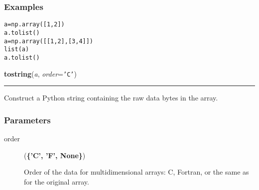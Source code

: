 \begin{boxedminipage}{\textwidth}

\hypertarget{examples}{}
\subsubsection*{Examples}
\begin{alltt}
\pysrcprompt{{\textgreater}{\textgreater}{\textgreater} }a = np.array([1, 2])
\pysrcprompt{{\textgreater}{\textgreater}{\textgreater} }a.tolist()
\pysrcoutput{[1, 2]}
\pysrcoutput{}\pysrcprompt{{\textgreater}{\textgreater}{\textgreater} }a = np.array([[1, 2], [3, 4]])
\pysrcprompt{{\textgreater}{\textgreater}{\textgreater} }list(a)
\pysrcoutput{}\pysrcprompt{{\textgreater}{\textgreater}{\textgreater} }a.tolist()
\pysrcoutput{[[1, 2], [3, 4]]}\end{alltt}
    \vspace{1ex}

    \end{boxedminipage}

    \label{numpy:ndarray:tostring}

    \vspace{0.5ex}

    \begin{boxedminipage}{\textwidth}

    \raggedright \textbf{tostring}(\textit{a}, \textit{order}=\texttt{'C'})

    \vspace{-1.5ex}

    \rule{\textwidth}{0.5\fboxrule}

Construct a Python string containing the raw data bytes in the array.



\hypertarget{parameters}{}
\subsubsection*{Parameters}
\begin{description}
\item[{order}] (\textbf{{\{}'C', 'F', None{\}}})

Order of the data for multidimensional arrays:
C, Fortran, or the same as for the original array.

\end{description}
    \vspace{1ex}

    \end{boxedminipage}

